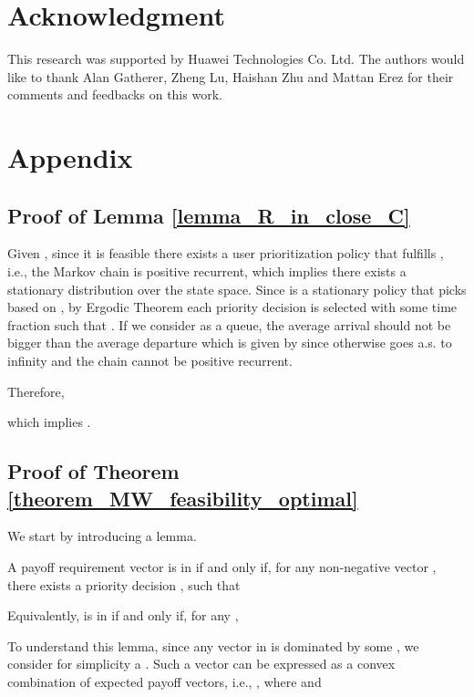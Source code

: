 \documentclass[prodmode,acmtompecs]{acmsmall}
\newcommand{\myComments}[1]{}
\newcommand{\commentEnd}{\myComments{End}}
\begin{document}
\section*{Acknowledgment}
This research was supported by Huawei Technologies Co. Ltd. 
The authors would like to thank Alan Gatherer, Zheng Lu, Haishan Zhu and Mattan Erez for their comments and feedbacks on this work. 
\commentEnd\fi

{}


\section{Appendix}

\subsection{Proof of Lemma \ref{lemma_R_in_close_C}}
\label{appendix_pf_lemma_F_in_close_C}
Given , since it is feasible there exists a user prioritization policy  that fulfills , i.e., the Markov chain  is positive recurrent, which implies there exists a stationary distribution over the state space. Since  is a stationary policy that picks  based on , by Ergodic Theorem each priority decision  is selected with some time fraction  such that  . If we consider  as a queue, the average arrival   should not be bigger than the average departure which is given by  since otherwise  goes a.s. to infinity and the chain cannot be positive recurrent. 

Therefore, 

which implies . 

\subsection{Proof of Theorem \ref{theorem_MW_feasibility_optimal}}
\label{appendix_pf_thm_MW_feasibility_optimal}
We start by introducing a lemma. 

\begin{lemma}
\label{lemma_feasibility_region_projection_understanding}
A payoff requirement vector  is in  if and only if, for any non-negative vector , there exists a priority decision , such that


Equivalently,  is in  if and only if, for any , 

\end{lemma}

To understand this lemma, since any vector in  is dominated by some , we consider for simplicity a . Such a vector can be expressed as a convex combination of expected payoff vectors, i.e., , where 
 and 
\end{document}
